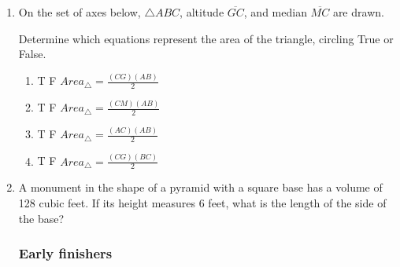 \documentclass[12pt, twoside]{article}
\begin{document}
\begin{enumerate}
  \item On the set of axes below, $\triangle ABC$, altitude $\overline{GC}$, and  median $\overline{MC}$ are drawn.
    \begin{center}
    \end{center}
      Determine which equations represent the area of the triangle, circling True or False.
      \begin{multicols}{2}
       \begin{enumerate}
          \item \quad T \quad F \quad $\displaystyle Area_\triangle = \frac{(CG)(AB)}{2}$
          \item \quad T \quad F \quad $\displaystyle Area_\triangle = \frac{(CM)(AB)}{2}$ \vspace{0.25cm}
          \item \quad T \quad F \quad $\displaystyle Area_\triangle = \frac{(AC)(AB)}{2}$ \vspace{0.25cm}
          \item \quad T \quad F \quad $\displaystyle Area_\triangle = \frac{(CG)(BC)}{2}$
      \end{enumerate}
      \end{multicols}
      \vspace{0.25cm}

  \item A monument in the shape of a pyramid with a square base has a volume of 128 cubic feet. If its height measures 6 feet, what is the length of the side of the base? \vspace{3.5cm}

\newpage
\subsubsection*{Early finishers}



\end{enumerate}
\end{document}
